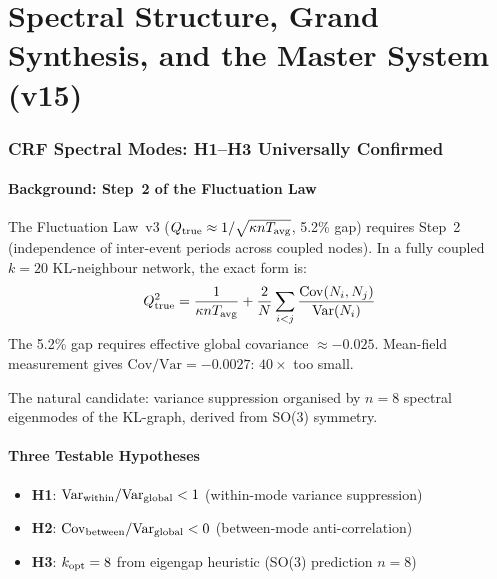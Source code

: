 \documentclass[12pt, a4paper]{article}
\begin{document}
\part{Spectral Structure, Grand Synthesis, and the Master System (v15)}

\section{CRF Spectral Modes: H1--H3 Universally Confirmed}

\subsection{Background: Step~2 of the Fluctuation Law}

The Fluctuation Law~v3 ($Q_{\rm true}\approx 1/\sqrt{\kappa n T_{\rm avg}}$, 5.2\% gap) requires Step~2 (independence of inter-event periods across coupled nodes). In a fully coupled $k=20$ KL-neighbour network, the exact form is:
\[
  Q^2_{\rm true} = \frac{1}{\kappa n T_{\rm avg}}
  + \frac{2}{N}\sum_{i<j}\frac{\mathrm{Cov}(N_i,N_j)}{\mathrm{Var}(N_i)}
\]
The 5.2\% gap requires effective global covariance $\approx -0.025$. Mean-field measurement gives $\mathrm{Cov}/\mathrm{Var}=-0.0027$: $40\times$ too small.

The natural candidate: variance suppression organised by $n=8$ spectral eigenmodes of the KL-graph, derived from SO(3) symmetry.

\subsection{Three Testable Hypotheses}

\begin{itemize}
\item \textbf{H1}: $\mathrm{Var}_{\rm within}/\mathrm{Var}_{\rm global}<1$ (within-mode variance suppression)
\item \textbf{H2}: $\mathrm{Cov}_{\rm between}/\mathrm{Var}_{\rm global}<0$ (between-mode anti-correlation)
\item \textbf{H3}: $k_{\rm opt}=8$ from eigengap heuristic (SO(3) prediction $n=8$)
\end{itemize}
\end{document}
